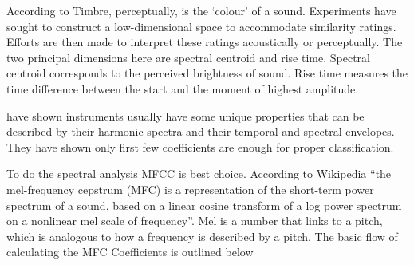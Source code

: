 \documentclass{article}
\begin{document}
According to \citet{Eronen2000} Timbre, perceptually, is the `colour' of a sound. Experiments have sought to construct a low-dimensional space to accommodate similarity ratings. Efforts are then made to interpret these ratings acoustically or perceptually.
The two principal dimensions here are spectral centroid and rise time. Spectral centroid corresponds to the perceived brightness of sound. Rise time measures the time difference between the start and the moment of highest amplitude.

\citet{deng2008study} have shown instruments usually have some unique properties that can be described by their 
harmonic spectra and their temporal and spectral envelopes. They have shown only first few coefficients are enough for proper classification.

To do the spectral analysis MFCC is best choice. According to Wikipedia\cite{wiki:00} ``the mel-frequency cepstrum (MFC) is a representation of the short-term power spectrum of a sound, based on a linear cosine transform of a log power spectrum on a nonlinear mel scale of frequency''. Mel is a number that links to a pitch, which is analogous to how a frequency is described by a pitch. The basic flow of calculating the MFC Coefficients is outlined below
\end{document}
